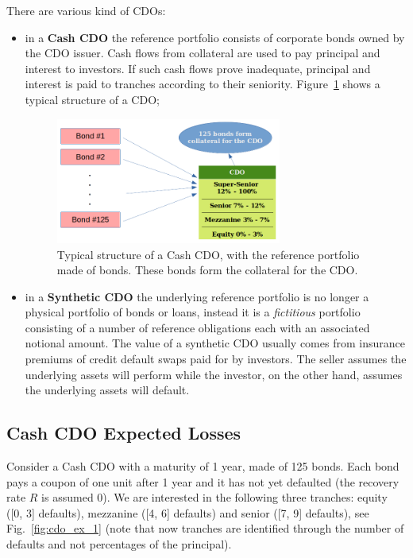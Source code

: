 There are various kind of CDOs:
\begin{itemize}
	\item in a \textbf{Cash CDO} the reference portfolio consists of corporate bonds owned by the CDO issuer. Cash flows from collateral are used to pay principal and interest to investors. If such cash flows prove inadequate, principal and interest is paid to tranches according to their seniority. Figure~\ref{fig:cdo_structure} shows a typical structure of a CDO;

\begin{figure}[htb]
	\centering
	\includegraphics[width=0.7\textwidth]{figures/cdo_structure}
	\caption{Typical structure of a Cash CDO, with the reference portfolio made of bonds. These bonds form the collateral for the CDO.}
	\label{fig:cdo_structure}
\end{figure}

	\item in a \textbf{Synthetic CDO} the underlying reference portfolio is no longer a physical portfolio of bonds or loans, instead it is a \emph{fictitious} portfolio consisting of a number of reference obligations each with an associated notional amount. The value of a synthetic CDO usually comes from insurance premiums of credit default swaps paid for by investors. The seller assumes the underlying assets will perform while the investor, on the other hand, assumes the underlying assets will default.
\end{itemize}

\subsection{Cash CDO Expected Losses}\label{sec:expected_losses}

Consider a Cash CDO with a maturity of 1 year, made of 125 bonds. Each bond pays a coupon of one unit after 1 year and it has not yet defaulted (the recovery rate $R$ is assumed 0). We are interested in the following three tranches: equity ([0, 3] defaults), mezzanine ([4, 6] defaults) and senior ([7, 9] defaults), see Fig.~\ref{fig:cdo_ex_1} (note that now tranches are identified through the number of defaults and not percentages of the principal). 

